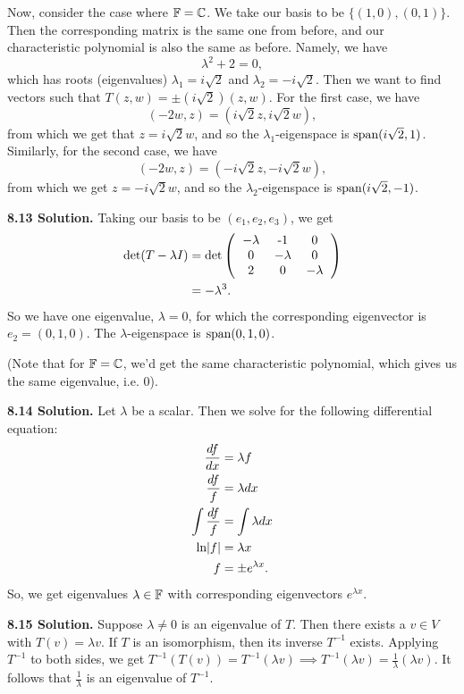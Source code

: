 Now, consider the case where $\mathbb{F} = \mathbb{C}$. We take our basis to be $\{(1, 0), (0, 1)\}$. Then the corresponding matrix is the same one from before, and our characteristic polynomial is also the same as before. Namely, we have
\[
\lambda^2 + 2 = 0,
\]
which has roots (eigenvalues) $\lambda_1 = i\sqrt{2}$ and $\lambda_2 = -i\sqrt{2}$. Then we want to find vectors such that $T(z, w) = \pm(i\sqrt{2})(z, w)$. For the first case, we have
\[
(-2w, z) = (i\sqrt{2}z, i\sqrt{2}w),
\]
from which we get that $z = i\sqrt{2}w$, and so the $\lambda_1$-eigenspace is $\text{span}(i\sqrt{2}, 1)$. Similarly, for the second case, we have
\[
(-2w, z) = (-i\sqrt{2}z, -i\sqrt{2}w),
\]
from which we get $z = -i\sqrt{2}w$, and so the $\lambda_2$-eigenspace is $\text{span}(i\sqrt{2}, -1)$.

\textbf{8.13 Solution.} Taking our basis to be $(e_1, e_2, e_3)$, we get
\begin{align*}
    \f{det}(T - \lambda I) &= \f{det}\left(\begin{tabular}{ccc}
        $-\lambda$ & -1 & 0 \\
        0 & $-\lambda$ & 0 \\
        2 & 0 & $-\lambda$
        \end{tabular}\right) \\
        &= -\lambda^3.
\end{align*}
So we have one eigenvalue, $\lambda = 0$, for which the corresponding eigenvector is $e_2 = (0, 1, 0)$. The $\lambda$-eigenspace is $\text{span}(0, 1, 0)$.

(Note that for $\mathbb{F} = \mathbb{C}$, we'd get the same characteristic polynomial, which gives us the same eigenvalue, i.e. 0).

\textbf{8.14 Solution.} Let $\lambda$ be a scalar. Then we solve for the following differential equation:
\begin{align*}
    \frac{df}{dx} &= \lambda f \\
    \frac{df}{f} &= \lambda dx \\
    \int\frac{df}{f} &= \int\lambda dx \\
    \text{ln}|f| &= \lambda x \\
    f &= \pm e^{\lambda x}.
\end{align*}
So, we get eigenvalues $\lambda \in \mathbb{F}$ with corresponding eigenvectors $e^{\lambda x}$.

\textbf{8.15 Solution.} Suppose $\lambda \neq 0$ is an eigenvalue of $T$. Then there exists a $v \in V$ with $T(v) = \lambda v$. If $T$ is an isomorphism, then its inverse $T^{-1}$ exists. Applying $T^{-1}$ to both sides, we get $T^{-1}(T(v)) = T^{-1}(\lambda v) \implies T^{-1}(\lambda v) = \frac{1}{\lambda}(\lambda v)$. It follows that $\frac{1}{\lambda}$ is an eigenvalue of $T^{-1}$.

